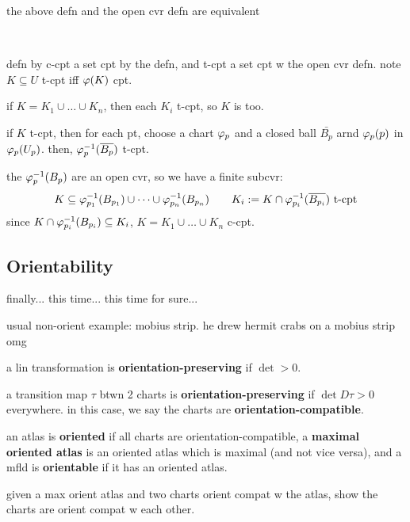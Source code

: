 \begin{thm}
	the above defn and the open cvr defn are equivalent
\end{thm} \

\begin{pf}[source=textbook]
	defn by c-cpt a set cpt by the defn, and t-cpt a set cpt w the open cvr defn.
	note $K\subseteq U$ t-cpt iff $\varphi(K)$ cpt.

	if $K=K_{1}\cup \dots \cup K_{n}$, then each $K_{i}$ t-cpt, so $K$ is too.

	if $K$ t-cpt, then for each pt, choose a chart $\varphi_{p}$ and
	a closed ball $\bar{B_{p}}$ arnd $\varphi_{p}(p)$ in $\varphi_{p}(U_{p})$.
	then, $\varphi_{p}^{-1}(\overline{B_{p}})$ t-cpt.

	the $\varphi_{p}^{-1}(B_{p})$ are an open cvr, so we have a finite subcvr:
	\begin{equation*}
	    K\subseteq\varphi_{p_{1}}^{-1}(B_{p_{1}})\cup \dots \cup
		\varphi_{p_{n}}^{-1}(B_{p_{n}}) \qquad
		K_{i}:=K\cap\varphi_{p_{i}}^{-1}(\overline{B_{p_{i}}}) \textrm{ t-cpt}
	\end{equation*}
	since $K\cap\varphi_{p_{i}}^{-1}(B_{p_{i}})\subseteq K_{i}$,
	$K=K_{1}\cup \dots \cup K_{n}$ c-cpt.
\end{pf}

\subsection{Orientability}
finally... this time... this time for sure...

usual non-orient example: mobius strip.
he drew hermit crabs on a mobius strip omg

\begin{defn}
    a lin transformation is \textbf{orientation-preserving} if $\det>0$.

	a transition map $\tau$ btwn 2 charts is \textbf{orientation-preserving} if
	$\det D\tau>0$ everywhere.
	in this case, we say the charts are \textbf{orientation-compatible}.

	an atlas is \textbf{oriented} if all charts are orientation-compatible,
	a \textbf{maximal oriented atlas} is an oriented atlas which is maximal
	(and not vice versa), and
	a mfld is \textbf{orientable} if it has an oriented atlas.
\end{defn}

\begin{exr}[source=Primary Source Material]
    given a max orient atlas and two charts orient compat w the atlas,
	show the charts are orient compat w each other.
\end{exr} \

